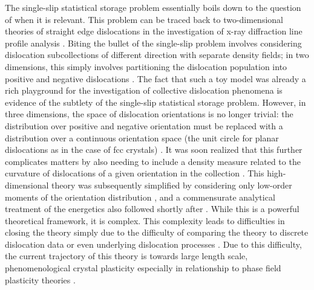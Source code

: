 The single-slip statistical storage problem essentially boils down to the question of when it is relevant. This problem can be traced back to two-dimensional theories of straight edge dislocations in the investigation of x-ray diffraction line profile analysis \cite{wilkensTheoreticalAspectsKinematical1970,Groma1998}. Biting the bullet of the single-slip problem involves considering dislocation subcollections of different direction with separate density fields; in two dimensions, this simply involves partitioning the dislocation population into positive and negative dislocations \cite{Groma1998,Groma1999,Zaiser2001,Groma2003}. The fact that such a toy model was already a rich playground for the investigation of collective dislocation phenomena \cite{ispanovityEvolutionCorrelationFunctions2008,dusanispanovityCriticalityRelaxationDislocation2011,dusanispanovityAvalanches2DDislocation2014,Ispanovity2017,Wu2018,wuCellStructureFormation2018,wuCyclicloadingMicrostructurepropertyRelations2019,Ispanovity2020} is evidence of the subtlety of the single-slip statistical storage problem. However, in three dimensions, the space of dislocation orientations is no longer trivial: the distribution over positive and negative orientation must be replaced with a distribution over a continuous orientation space (the unit circle for planar dislocations as in the case of fcc crystals) \cite{El-Azab2000a}. It was soon realized that this further complicates matters by also needing to include a density measure related to the curvature of dislocations of a given orientation in the collection \cite{Hochrainer2007}. This high-dimensional theory was subsequently simplified by considering only low-order moments of the orientation distribution \cite{Hochrainer2015}, and a commensurate analytical treatment of the energetics also followed shortly after \cite{Zaiser2015}. While this is a powerful theoretical framework, it is complex. This complexity leads to difficulties in closing the theory simply due to the difficulty of comparing the theory to discrete dislocation data or even underlying dislocation processes \cite{SandfeldPo2015,Monavari2016,Monavari2018,Sandfeld2019,Sudmanns2019,Sudmanns2020,Song2021,Hochrainer2022}. Due to this difficulty, the current trajectory of this theory is towards large length scale, phenomenological crystal plasticity especially in relationship to phase field plasticity theories \cite{Groma2015,Groma2021,zhangContinuumDislocationDynamics2025}.

